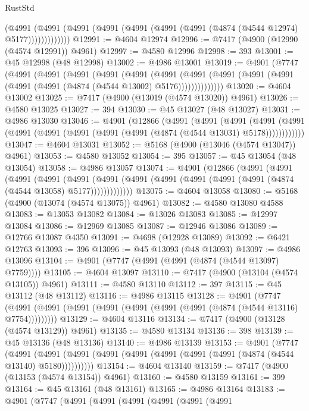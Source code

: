 \begin{lexlean}{RustStd}
\begin{coremodule}
              (@4991
                (@4991 (@4991 (@4991 (@4991 (@4991 (@4991 (@4874 (@4544 @12974) @5177)))))))))))))
@12991 := @4604 @12974
@12996 := @7417 (@4900 (@12990 (@4574 @12991)) @4961)
@12997 := @4580 @12996
@12998 := 393
@13001 := @45 @12998 (@48 @12998)
@13002 := @4986 @13001
@13019 := @4901
    (@7747
      (@4991
        (@4991
          (@4991
            (@4991
              (@4991
                (@4991
                  (@4991
                    (@4991 (@4991 (@4991 (@4991 (@4991 (@4874 (@4544 @13002) @5176))))))))))))))
@13020 := @4604 @13002
@13025 := @7417 (@4900 (@13019 (@4574 @13020)) @4961)
@13026 := @4580 @13025
@13027 := 394
@13030 := @45 @13027 (@48 @13027)
@13031 := @4986 @13030
@13046 := @4901
    (@12866
      (@4991
        (@4991
          (@4991
            (@4991 (@4991 (@4991 (@4991 (@4991 (@4991 (@4991 (@4874 (@4544 @13031) @5178))))))))))))
@13047 := @4604 @13031
@13052 := @5168 (@4900 (@13046 (@4574 @13047)) @4961)
@13053 := @4580 @13052
@13054 := 395
@13057 := @45 @13054 (@48 @13054)
@13058 := @4986 @13057
@13074 := @4901
    (@12866
      (@4991
        (@4991
          (@4991
            (@4991
              (@4991
                (@4991 (@4991 (@4991 (@4991 (@4991 (@4991 (@4874 (@4544 @13058) @5177)))))))))))))
@13075 := @4604 @13058
@13080 := @5168 (@4900 (@13074 (@4574 @13075)) @4961)
@13082 := @4580 @13080 @4588
@13083 := @13053 @13082
@13084 := @13026 @13083
@13085 := @12997 @13084
@13086 := @12969 @13085
@13087 := @12946 @13086
@13089 := @12766 @13087 @4350
@13091 := @4698 (@12928 @13089)
@13092 := @6421 @12763
@13093 := 396
@13096 := @45 @13093 (@48 @13093)
@13097 := @4986 @13096
@13104 := @4901 (@7747 (@4991 (@4991 (@4874 (@4544 @13097) @7759))))
@13105 := @4604 @13097
@13110 := @7417 (@4900 (@13104 (@4574 @13105)) @4961)
@13111 := @4580 @13110
@13112 := 397
@13115 := @45 @13112 (@48 @13112)
@13116 := @4986 @13115
@13128 := @4901
    (@7747 (@4991 (@4991 (@4991 (@4991 (@4991 (@4991 (@4991 (@4874 (@4544 @13116) @7754)))))))))
@13129 := @4604 @13116
@13134 := @7417 (@4900 (@13128 (@4574 @13129)) @4961)
@13135 := @4580 @13134
@13136 := 398
@13139 := @45 @13136 (@48 @13136)
@13140 := @4986 @13139
@13153 := @4901
    (@7747
      (@4991 (@4991 (@4991 (@4991 (@4991 (@4991 (@4991 (@4991 (@4874 (@4544 @13140) @5180))))))))))
@13154 := @4604 @13140
@13159 := @7417 (@4900 (@13153 (@4574 @13154)) @4961)
@13160 := @4580 @13159
@13161 := 399
@13164 := @45 @13161 (@48 @13161)
@13165 := @4986 @13164
@13183 := @4901
    (@7747
      (@4991
        (@4991
          (@4991
            (@4991
              (@4991
                (@4991

\end{coremodule}
\end{lexlean}
